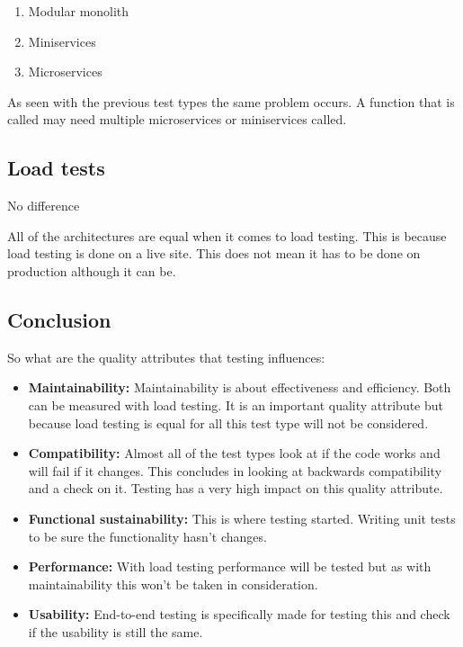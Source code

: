 \begin{enumerate}
        \item Modular monolith
        \item Miniservices
        \item Microservices
\end{enumerate}

As seen with the previous test types the same problem occurs. A function that is called may need multiple microservices or miniservices called.

\subsection{Load tests}

No difference

All of the architectures are equal when it comes to load testing. This is because load testing is done on a live site. This does not mean it has to be done on production although it can be.

\subsection{Conclusion}

So what are the quality attributes that testing influences:

\begin{itemize}
        \item \textbf{Maintainability:} Maintainability is about effectiveness and efficiency. Both can be measured with load testing. It is an important quality attribute but because load testing is equal for all this test type will not be considered.

        \item \textbf{Compatibility:} Almost all of the test types look at if the code works and will fail if it changes. This concludes in looking at backwards compatibility and a check on it. Testing has a very high impact on this quality attribute.

        \item \textbf{Functional sustainability:} This is where testing started. Writing unit tests to be sure the functionality hasn’t changes.

        \item \textbf{Performance:} With load testing performance will be tested but as with maintainability this won’t be taken in consideration.

        \item \textbf{Usability:} End-to-end testing is specifically made for testing this and check if the usability is still the same.
\end{itemize}

